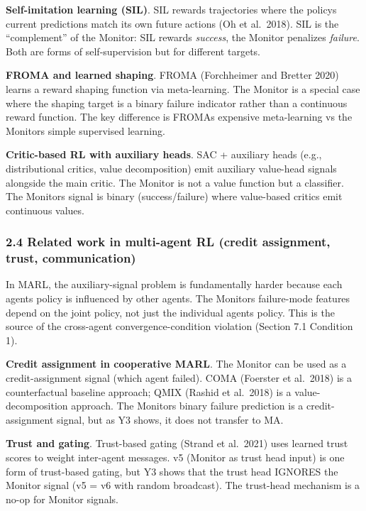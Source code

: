 \documentclass[11pt]{article}
\begin{document}
\textbf{Self-imitation learning (SIL)}. SIL rewards trajectories where
the policys current predictions match its own future actions (Oh et
al.~2018). SIL is the ``complement'' of the Monitor: SIL rewards
\emph{success}, the Monitor penalizes \emph{failure}. Both are forms of
self-supervision but for different targets.

\textbf{FROMA and learned shaping}. FROMA (Forchheimer and Bretter 2020)
learns a reward shaping function via meta-learning. The Monitor is a
special case where the shaping target is a binary failure indicator
rather than a continuous reward function. The key difference is FROMAs
expensive meta-learning vs the Monitors simple supervised learning.

\textbf{Critic-based RL with auxiliary heads}. SAC + auxiliary heads
(e.g., distributional critics, value decomposition) emit auxiliary
value-head signals alongside the main critic. The Monitor is not a value
function but a classifier. The Monitors signal is binary
(success/failure) where value-based critics emit continuous values.

\subsubsection{2.4 Related work in multi-agent RL (credit assignment,
trust,
communication)}\label{related-work-in-multi-agent-rl-credit-assignment-trust-communication}

In MARL, the auxiliary-signal problem is fundamentally harder because
each agents policy is influenced by other agents. The Monitors
failure-mode features depend on the joint policy, not just the
individual agents policy. This is the source of the cross-agent
convergence-condition violation (Section 7.1 Condition 1).

\textbf{Credit assignment in cooperative MARL}. The Monitor can be used
as a credit-assignment signal (which agent failed). COMA (Foerster et
al.~2018) is a counterfactual baseline approach; QMIX (Rashid et
al.~2018) is a value- decomposition approach. The Monitors binary
failure prediction is a credit-assignment signal, but as Y3 shows, it
does not transfer to MA.

\textbf{Trust and gating}. Trust-based gating (Strand et al.~2021) uses
learned trust scores to weight inter-agent messages. v5 (Monitor as
trust head input) is one form of trust-based gating, but Y3 shows that
the trust head IGNORES the Monitor signal (v5 = v6 with random
broadcast). The trust-head mechanism is a no-op for Monitor signals.
\end{document}
